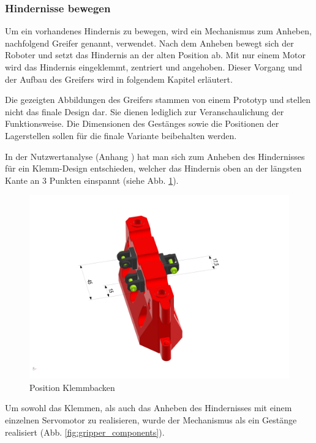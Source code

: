 \newpage

\subsubsection{Hindernisse bewegen}
\label{subsubsection:Hindernisse bewegen}

Um ein vorhandenes Hindernis zu bewegen, wird ein Mechanismus zum Anheben, nachfolgend Greifer genannt, verwendet. Nach dem Anheben bewegt sich der Roboter und setzt das Hindernis an der alten Position ab.
Mit nur einem Motor wird das Hindernis eingeklemmt, zentriert und angehoben. Dieser Vorgang und der Aufbau des Greifers wird in folgendem Kapitel erläutert.

Die gezeigten Abbildungen des Greifers stammen von einem Prototyp und stellen nicht das finale Design dar. Sie dienen lediglich zur Veranschaulichung der Funktionsweise. Die Dimensionen des Gestänges sowie die Positionen der Lagerstellen sollen für die finale Variante beibehalten werden.

In der Nutzwertanalyse (Anhang ) hat man sich zum Anheben des Hindernisses für ein Klemm-Design entschieden, welcher das Hindernis oben an der längsten Kante an 3 Punkten einspannt (siehe Abb. \ref{fig:obstacle_clamping_concept}). 


\begin{figure}[H]
\centering
\includegraphics[width=0.95\linewidth]{assets/greifer-prototyp/Greifer_Backen_Trimetric.png} 
\caption{Position Klemmbacken}
\label{fig:obstacle_clamping_concept}
\end{figure}

\newpage

Um sowohl das Klemmen, als auch das Anheben des Hindernisses mit einem einzelnen Servomotor zu realisieren, wurde der Mechanismus als ein Gestänge realisiert (Abb. \ref{fig:gripper_components}).

